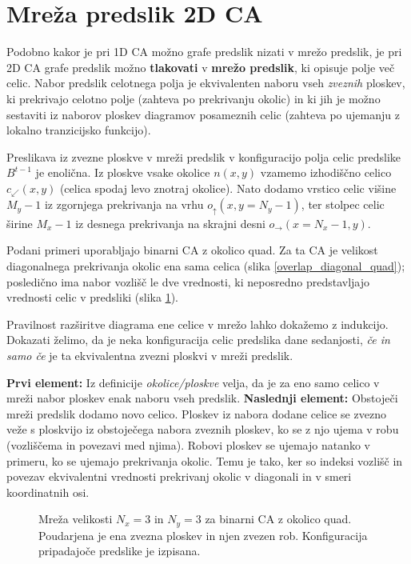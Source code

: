 \documentclass[12pt,a4paper,openany,twoside]{book}
\begin{document}
\section{Mreža predslik 2D CA}

Podobno kakor je pri 1D CA možno grafe predslik nizati v mrežo predslik,
je pri 2D CA grafe predslik možno \textbf{tlakovati} v \textbf{mrežo predslik},
ki opisuje polje več celic.
Nabor predslik celotnega polja je ekvivalenten naboru vseh \textit{zveznih} ploskev,
ki prekrivajo celotno polje (zahteva po prekrivanju okolic)
in ki jih je možno sestaviti iz naborov ploskev diagramov posameznih celic
(zahteva po ujemanju z lokalno tranzicijsko funkcijo).

Preslikava iz zvezne ploskve v mreži predslik v konfiguracijo polja celic predslike \(B^{t-1}\) je enolična.
Iz ploskve vsake okolice \(n(x,y)\) vzamemo izhodiščno celico
\(c_{\swarrow}(x,y)\) (celica spodaj levo znotraj okolice).
Nato dodamo vrstico celic višine \(M_y-1\) iz zgornjega prekrivanja na vrhu \(o_{\uparrow}(x,y=N_y-1)\),
ter stolpec celic širine \(M_x-1\) iz desnega prekrivanja na skrajni desni \(o_{\rightarrow}(x=N_x-1,y)\).

Podani primeri uporabljajo binarni CA z okolico quad.
Za ta CA je velikost diagonalnega prekrivanja okolic ena sama celica (slika \ref{overlap_diagonal_quad});
posledično ima nabor vozlišč le dve vrednosti, ki neposredno predstavljajo
vrednosti celic v predsliki (slika \ref{network_array}).

Pravilnost razširitve diagrama ene celice v mrežo lahko dokažemo z indukcijo.
Dokazati želimo, da je neka konfiguracija celic predslika dane sedanjosti,
\textit{če in samo če} je ta ekvivalentna zvezni ploskvi v mreži predslik.

\textbf{Prvi element:}
Iz definicije \textit{okolice/ploskve} velja,
da je za eno samo celico v mreži nabor ploskev enak naboru vseh predslik.
\textbf{Naslednji element:}
Obstoječi mreži predslik dodamo novo celico.
Ploskev iz nabora dodane celice se zvezno veže s ploskvijo
iz obstoječega nabora zveznih ploskev,
ko se z njo ujema v robu (vozliščema in povezavi med njima).
Robovi ploskev se ujemajo natanko v primeru, ko se ujemajo prekrivanja okolic.
Temu je tako, ker so indeksi vozlišč in povezav ekvivalentni
vrednosti prekrivanj okolic v diagonali in v smeri koordinatnih osi.

\begin{figure}[htb]
\centerline{}
\caption[Mreža polja celic.]{Mreža velikosti \(N_x=3\) in \(N_y=3\) za binarni CA z okolico quad.
Poudarjena je ena zvezna ploskev in njen zvezen rob. Konfiguracija pripadajoče predslike je izpisana.}
\label{network_array}
\end{figure}
\end{document}
